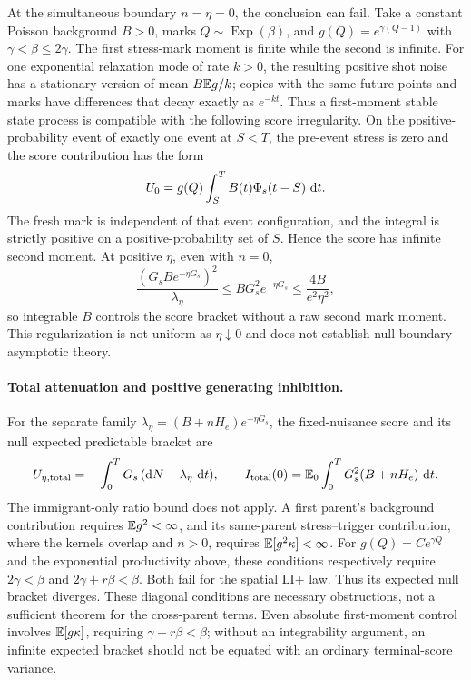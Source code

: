 At the simultaneous boundary \(n=\eta=0\), the conclusion can fail. Take a constant Poisson background \(B>0\), marks \(Q\sim\operatorname{Exp}(\beta)\), and \(g(Q)=e^{\gamma(Q-1)}\) with \(\gamma<\beta\le2\gamma\). The first stress-mark moment is finite while the second is infinite. For one exponential relaxation mode of rate \(k>0\), the resulting positive shot noise has a stationary version of mean \(B\mathbb{E} g/k\); copies with the same future points and marks have differences that decay exactly as \(e^{-kt}\). Thus a first-moment stable state process is compatible with the following score irregularity. On the positive-probability event of exactly one event at \(S<T\), the pre-event stress is zero and the score contribution has the form
\[
U_0=g(Q)\int_S^T B(t)\Phi_s(t-S)\,\mathop{}\!\mathrm{d} t.
\]
The fresh mark is independent of that event configuration, and the integral is strictly positive on a positive-probability set of \(S\). Hence the score has infinite second moment. At positive \(\eta\), even with \(n=0\),
\[
\frac{(G_sB e^{-\eta G_s})^2}{\lambda_\eta}
\le B G_s^2e^{-\eta G_s}
\le\frac{4B}{e^2\eta^2},
\]
so integrable \(B\) controls the score bracket without a raw second mark moment. This regularization is not uniform as \(\eta\downarrow0\) and does not establish null-boundary asymptotic theory.

\paragraph{Total attenuation and positive generating inhibition.}
For the separate family \(\lambda_\eta=(B+nH_e)e^{-\eta G_s}\), the fixed-nuisance score and its null expected predictable bracket are
\[
U_{\eta,\mathrm{total}}
=-\int_0^T G_s\,(\mathop{}\!\mathrm{d} N-\lambda_\eta\,\mathop{}\!\mathrm{d} t),
\qquad
I_{\mathrm{total}}(0)=
\mathbb{E}_0\int_0^T G_s^2(B+nH_e)\,\mathop{}\!\mathrm{d} t.
\]
The immigrant-only ratio bound does not apply. A first parent's background contribution requires \(\mathbb{E} g^2<\infty\), and its same-parent stress--trigger contribution, where the kernels overlap and \(n>0\), requires \(\mathbb{E}[g^2\kappa]<\infty\). For \(g(Q)=C e^{\gamma Q}\) and the exponential productivity above, these conditions respectively require \(2\gamma<\beta\) and \(2\gamma+r\beta<\beta\). Both fail for the spatial LI+ law. Thus its expected null bracket diverges. These diagonal conditions are necessary obstructions, not a sufficient theorem for the cross-parent terms. Even absolute first-moment control involves \(\mathbb{E}[g\kappa]\), requiring \(\gamma+r\beta<\beta\); without an integrability argument, an infinite expected bracket should not be equated with an ordinary terminal-score variance.

